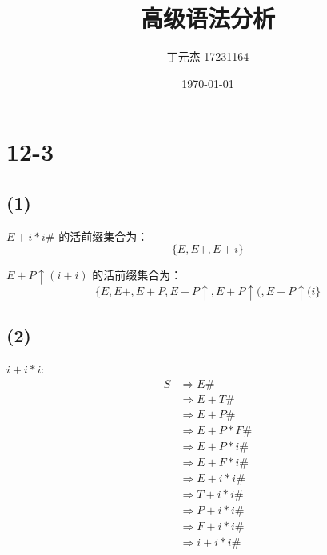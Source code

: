 \documentclass[UTF8]{ctexart}
\title{高级语法分析}
\author{丁元杰 17231164}
\date{\today}
\begin{document}
\maketitle


\section*{12-3}

    \subsection*{(1)}
        $E+i*i\#$ 的活前缀集合为：
        $$\{E, E+, E+i\}$$

        $E+P\uparrow(i+i)$ 的活前缀集合为：
        $$\{E, E+, E+P, E+P\uparrow, E+P\uparrow(, E+P\uparrow(i\}$$

    \subsection*{(2)}

        $i+i*i$: 
        \begin{align*}
            S 
            & \Rightarrow E\# \\
            & \Rightarrow E+T\# \\
            & \Rightarrow E+P\# \\
            & \Rightarrow E+P*F\# \\
            & \Rightarrow E+P*i\# \\
            & \Rightarrow E+F*i\# \\
            & \Rightarrow E+i*i\# \\
            & \Rightarrow T+i*i\# \\
            & \Rightarrow P+i*i\# \\
            & \Rightarrow F+i*i\# \\
            & \Rightarrow i+i*i\#
        \end{align*}
\end{document}
